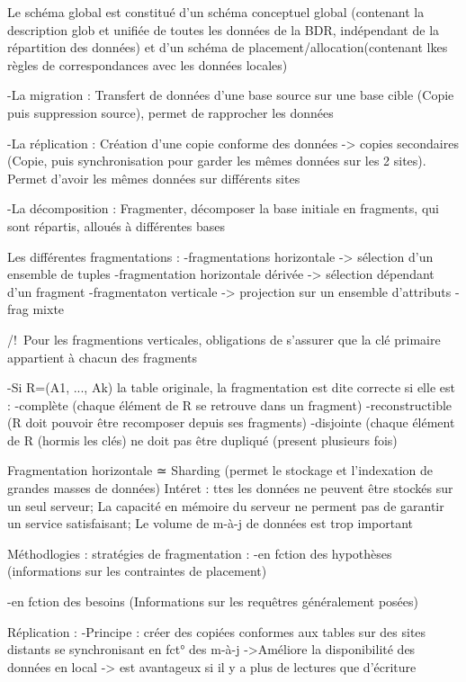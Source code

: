 	Le schéma global est constitué d'un schéma conceptuel global (contenant la description glob et unifiée de toutes les données de la BDR, indépendant de la répartition des données) et d'un schéma de placement/allocation(contenant lkes règles de correspondances avec les données locales)


-La migration : Transfert de données d'une base source sur une base cible (Copie puis suppression source), permet de rapprocher les données

-La réplication : Création d'une copie conforme des données -> copies secondaires (Copie, puis synchronisation pour garder les mêmes données sur les 2 sites). Permet d'avoir les mêmes données sur différents sites

-La décomposition : Fragmenter, décomposer la base initiale en fragments, qui sont répartis, alloués à différentes bases

Les différentes fragmentations :
	-fragmentations horizontale 		-> sélection d'un ensemble de tuples
	-fragmentation horizontale dérivée	-> sélection dépendant d'un fragment
	-fragmentaton verticale				-> projection sur un ensemble d'attributs
	-frag mixte

/!\ Pour les fragmentions verticales, obligations de s'assurer que la clé primaire appartient à chacun des fragments

-Si R=(A1, ..., Ak) la table originale, la fragmentation est dite correcte si elle est :
	-complète (chaque élément de R se retrouve dans un fragment)
	-reconstructible (R doit pouvoir être recomposer depuis ses fragments)
	-disjointe (chaque élément de R (hormis les clés) ne doit pas être dupliqué (present plusieurs fois)



Fragmentation horizontale ≃ Sharding (permet le stockage et l'indexation de grandes masses de données)
	Intéret : ttes les données ne peuvent être stockés sur un seul serveur; La capacité en mémoire du serveur ne perment pas de garantir un service satisfaisant; Le volume de m-à-j de données est trop important


Méthodlogies :
stratégies de fragmentation :
	-en fction des hypothèses (informations sur les contraintes de placement)
	
	-en fction des besoins (Informations sur les requêtres généralement posées)


Réplication :
-Principe : créer des copiées conformes aux tables sur des sites distants se synchronisant en fct° des m-à-j
	->Améliore la disponibilité des données en local
	-> est avantageux si il y a plus de lectures que d'écriture

